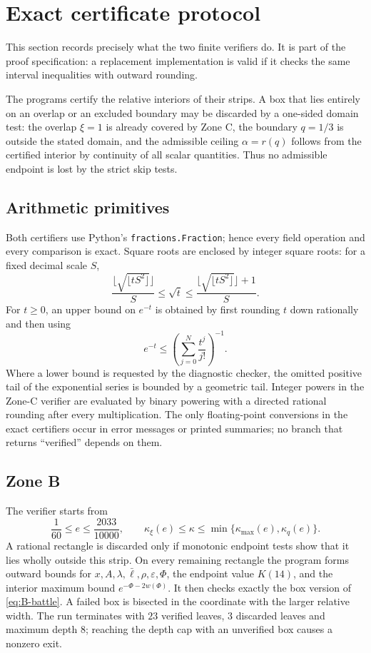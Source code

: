 \documentclass[11pt]{article}
\begin{document}
\section{Exact certificate protocol}\label{sec:certificate-protocol}

This section records precisely what the two finite verifiers do.  It is part
of the proof specification: a replacement implementation is valid if it
checks the same interval inequalities with outward rounding.

The programs certify the relative interiors of their strips.  A box that lies
entirely on an overlap or an excluded boundary may be discarded by a
one-sided domain test: the overlap $\xi=1$ is already covered by Zone C, the
boundary $q=1/3$ is outside the stated domain, and the admissible ceiling
$\alpha=r(q)$ follows from the certified interior by continuity of all scalar
quantities.  Thus no admissible endpoint is lost by the strict skip tests.

\subsection{Arithmetic primitives}

Both certifiers use Python's \texttt{fractions.Fraction}; hence every field
operation and every comparison is exact.  Square roots are enclosed by
integer square roots: for a fixed decimal scale $S$,
\[
 \frac{\lfloor\sqrt{\lfloor tS^2\rfloor}\rfloor}{S}
 \le\sqrt t\le
 \frac{\lfloor\sqrt{\lfloor tS^2\rfloor}\rfloor+1}{S}.
\]
For $t\ge0$, an upper bound on $e^{-t}$ is obtained by first rounding $t$
down rationally and then using
\[
        e^{-t}\le
        \left(\sum_{j=0}^{N}\frac{t^j}{j!}\right)^{-1}.
\]
Where a lower bound is requested by the diagnostic checker, the omitted
positive tail of the exponential series is bounded by a geometric tail.
Integer powers in the Zone-C verifier are evaluated by binary powering with
a directed rational rounding after every multiplication.  The only
floating-point conversions in the exact certifiers occur in error messages
or printed summaries; no branch that returns ``verified'' depends on them.

\subsection{Zone B}

The verifier starts from
\[
 \frac1{60}\le e\le\frac{2033}{10000},
 \qquad
 \kappa_\xi(e)\le\kappa\le
 \min\{\kappa_{\max}(e),\kappa_q(e)\}.
\]
A rational rectangle is discarded only if monotonic endpoint tests show
that it lies wholly outside this strip.  On every remaining rectangle the
program forms outward bounds for $x,A,\lambda,\bar\ell,\rho,\varepsilon,
\Phi$, the endpoint value $K(14)$, and the interior maximum bound
$e^{-\Phi-2w(\Phi)}$.  It then checks exactly the box version of
\eqref{eq:B-battle}.  A failed box is bisected in the coordinate with the
larger relative width.  The run terminates with $23$ verified leaves,
$3$ discarded leaves and maximum depth $8$; reaching the depth cap with an
unverified box causes a nonzero exit.
\end{document}
